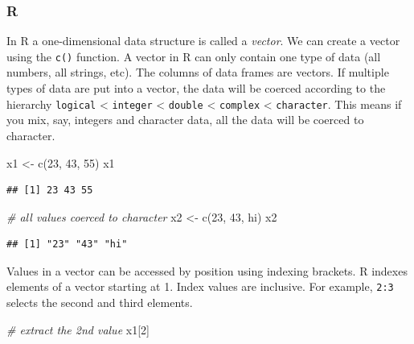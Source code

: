 \documentclass[
]{book}
\newenvironment{Shaded}{\begin{snugshade}}{\end{snugshade}}
\newcommand{\CommentTok}[1]{\textcolor[rgb]{0.56,0.35,0.01}{\textit{#1}}}
\newcommand{\DecValTok}[1]{\textcolor[rgb]{0.00,0.00,0.81}{#1}}
\newcommand{\FunctionTok}[1]{\textcolor[rgb]{0.00,0.00,0.00}{#1}}
\newcommand{\NormalTok}[1]{#1}
\newcommand{\OtherTok}[1]{\textcolor[rgb]{0.56,0.35,0.01}{#1}}
\newcommand{\StringTok}[1]{\textcolor[rgb]{0.31,0.60,0.02}{#1}}
\begin{document}
\hypertarget{r-8}{%
\subsubsection*{R}\label{r-8}}

In R a one-dimensional data structure is called a \emph{vector}. We can create a vector using the \texttt{c()} function. A vector in R can only contain one type of data (all numbers, all strings, etc). The columns of data frames are vectors. If multiple types of data are put into a vector, the data will be coerced according to the hierarchy \texttt{logical} \textless{} \texttt{integer} \textless{} \texttt{double} \textless{} \texttt{complex} \textless{} \texttt{character}. This means if you mix, say, integers and character data, all the data will be coerced to character.

\begin{Shaded}
\begin{Highlighting}[]
\NormalTok{x1 }\OtherTok{\textless{}{-}} \FunctionTok{c}\NormalTok{(}\DecValTok{23}\NormalTok{, }\DecValTok{43}\NormalTok{, }\DecValTok{55}\NormalTok{)}
\NormalTok{x1}
\end{Highlighting}
\end{Shaded}

\begin{verbatim}
## [1] 23 43 55
\end{verbatim}

\begin{Shaded}
\begin{Highlighting}[]
\CommentTok{\# all values coerced to character}
\NormalTok{x2 }\OtherTok{\textless{}{-}} \FunctionTok{c}\NormalTok{(}\DecValTok{23}\NormalTok{, }\DecValTok{43}\NormalTok{, }\StringTok{\textquotesingle{}hi\textquotesingle{}}\NormalTok{)}
\NormalTok{x2}
\end{Highlighting}
\end{Shaded}

\begin{verbatim}
## [1] "23" "43" "hi"
\end{verbatim}

Values in a vector can be accessed by position using indexing brackets. R indexes elements of a vector starting at 1. Index values are inclusive. For example, \texttt{2:3} selects the second and third elements.

\begin{Shaded}
\begin{Highlighting}[]
\CommentTok{\# extract the 2nd value}
\NormalTok{x1[}\DecValTok{2}\NormalTok{]}
\end{Highlighting}
\end{Shaded}
\end{document}
